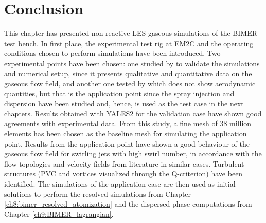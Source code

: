 \section{Conclusion}

This chapter has presented non-reactive LES gaseous simulations of the BIMER test bench. In first place, the experimental test rig at EM2C and the operating conditions chosen to perform simulations have been introduced. Two experimental points have been chosen: one studied by  to validate the simulations and numerical setup, since it presents qualitative and quantitative data on the gaseous flow field, and another one tested by  which does not show aerodynamic quantities, but that is the application point since the spray injection and dispersion have been studied and, hence, is used as the test case in the next chapters. Results obtained with YALES2 for the validation case have shown good agreements with experimental data. From this study, a fine mesh of 38 million elements has been chosen as the baseline mesh for simulating the application point. Results from the application point have shown a good behaviour of the gaseous flow field for swirling jets with high swirl number, in accordance with the flow topologies and velocity fields from literature in similar cases. Turbulent structures (PVC and vortices visualized through the Q-criterion) have been identified. The simulations of the application case are then used as initial solutions to perform the resolved simulations from Chapter \ref{ch8:bimer_resolved_atomization} and the dispersed phase computations from Chapter \ref{ch9:BIMER_lagrangian}.

%